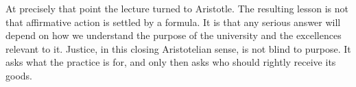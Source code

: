 At precisely that point the lecture turned to Aristotle. The resulting lesson is not that affirmative action is settled by a formula. It is that any serious answer will depend on how we understand the purpose of the university and the excellences relevant to it. Justice, in this closing Aristotelian sense, is not blind to purpose. It asks what the practice is for, and only then asks who should rightly receive its goods.
